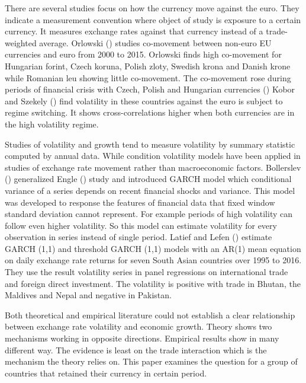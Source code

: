 \vspace{\baselineskip}

There are several studies focus on how the currency move against the euro.
They indicate a measurement convention where object of study is exposure to a certain currency.
It measures exchange rates against that currency instead of a trade-weighted average.
Orlowski (\citeyear{orlowski_co-movements_2016}) studies co-movement between non-euro EU currencies and euro from 2000 to 2015.
Orlowski finds high co-movement for Hungarian forint, Czech koruna, Polish zloty, Swedish krona and Danish krone while Romanian leu showing little co-movement.
The co-movement rose during periods of financial crisis with Czech, Polish and Hungarian currencies (\cite{chomicz-grabowska_financial_2020})
Kobor and Szekely (\citeyear{kobor_foreign_2004}) find volatility in these countries against the euro is subject to regime switching.
It shows cross-correlations higher when both currencies are in the high volatility regime.

\vspace{\baselineskip}

Studies of volatility and growth tend to measure volatility by summary statistic computed by annual data.
While condition volatility models have been applied in studies of exchange rate movement rather than macroeconomic factors.
Bollerslev (\citeyear{bollerslev_generalized_1986}) generalized Engle (\citeyear{engle_autoregressive_1982}) study and introduced GARCH model which conditional variance of a series depends on recent financial shocks and variance.
This model was developed to response the features of financial data that fixed window standard deviation cannot represent.
For example periods of high volatility can follow even higher volatility.
So this model can estimate volatility for every observation in series instead of single period.
Latief and Lefen (\citeyear{latief_effect_2018}) estimate GARCH (1,1) and threshold GARCH (1,1) models with an AR(1) mean equation on daily exchange rate returns for seven South Asian countries over 1995 to 2016.
They use the result volatility series in panel regressions on international trade and foreign direct investment.
The volatility is positive with trade in Bhutan, the Maldives and Nepal and negative in Pakistan.

\vspace{\baselineskip}

Both theoretical and empirical literature could not establish a clear relationship between exchange rate volatility and economic growth.
Theory shows two mechanisms working in opposite directions.
Empirical results show in many different way.
The evidence is least on the trade interaction which is the mechanism the theory relies on.
This paper examines the question for a group of countries that retained their currency in certain period.
